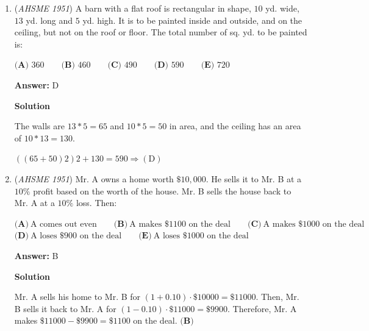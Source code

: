 \begin{enumerate}
\textbf{Solution 1}

Let $s$ be the side length of the square. By the \href{https://artofproblemsolving.com/wiki/index.php?title=Pythagorean\_Theorem}{Pythagorean Theorem}, $s^2 + s^2 = 2s^2 = (a+b)^2$, so the area of the square is $s^2 = \boxed{\textbf{(B)}\  \frac{1}{2}(a+b)^2}$.

 



\textbf{Solution 2}

Recall that the area of a rhombus is equal to half the product of its diagonals, so the area of this square is $\boxed{\textbf{(B)}\  \frac{1}{2}(a+b)^2}$.

 


	\item (\textit{AHSME 1951}) A barn with a flat roof is rectangular in shape, $10$ yd. wide, $13$ yd. long and $5$ yd. high.  It is to be painted inside and outside, and on the ceiling, but not on the roof or floor. The total number of sq. yd. to be painted is:


 $\textbf{(A) \ } 360 \qquad \textbf{(B) \ } 460 \qquad \textbf{(C) \ } 490 \qquad \textbf{(D) \ } 590 \qquad \textbf{(E) \ } 720$

 \textbf{Answer: }D



\textbf{Solution}

The walls are $13*5=65$ and $10*5=50$ in area, and the ceiling has an area of $10*13=130$.

 $((65+50)2)2+130=590 \Rightarrow \boxed{\mathrm{(D)}}$



	\item (\textit{AHSME 1951}) Mr. A owns a home worth $\$10,000$.  He sells it to Mr. B at a $10 \%$ profit based on the worth of the house. Mr. B sells the house back to Mr. A at a $10 \%$ loss.  Then:


 $\textbf{(A)}\ \text{A comes out even} \qquad\textbf{(B)}\ \text{A makes \$1100 on the deal} \qquad\textbf{(C)}\ \text{A makes \$1000 on the deal}$
$\textbf{(D)}\ \text{A loses \$900 on the deal} \qquad\textbf{(E)}\ \text{A loses \$1000 on the deal}$

 \textbf{Answer: }B



\textbf{Solution}

Mr. A sells his home to Mr. B for $(1 + 0.10) \cdot \$10000 = \$11000$. Then, Mr. B sells it back to Mr. A for $(1 - 0.10) \cdot \$11000 = \$9900$. Therefore, Mr. A makes $\$11000-\$9900=\$1100$ on the deal. $\boxed{\textbf{(B)}}$




\end{enumerate}
